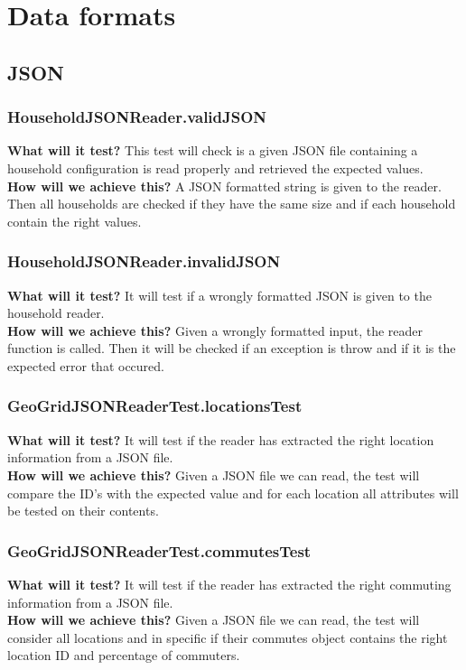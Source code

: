 \documentclass{article}
\begin{document}
\section{Data formats}
\subsection{JSON}
\subsubsection{HouseholdJSONReader.validJSON}
\textbf{What will it test?}
This test will check is a given JSON file containing a household configuration is read properly and retrieved the expected values. \\
\newline
\textbf{How will we achieve this?}
A JSON formatted string is given to the reader. Then all households are checked if they have the same size and if each household contain the right values.

\subsubsection{HouseholdJSONReader.invalidJSON}
\textbf{What will it test?}
It will test if a wrongly formatted JSON is given to the household reader.\\
\newline
\textbf{How will we achieve this?}
Given a wrongly formatted input, the reader function is called. Then it will be checked if an exception is throw and if it is the expected error that occured.

\subsubsection{GeoGridJSONReaderTest.locationsTest}
\textbf{What will it test?}
It will test if the reader has extracted the right location information from a JSON file. \\
\newline
\textbf{How will we achieve this?}
Given a JSON file we can read, the test will compare the ID's with the expected value and for each location all attributes will be tested on their contents.

\subsubsection{GeoGridJSONReaderTest.commutesTest}
\textbf{What will it test?}
It will test if the reader has extracted the right commuting information from a JSON file. \\
\newline
\textbf{How will we achieve this?}
Given a JSON file we can read, the test will consider all locations and in specific if their commutes object contains the right location ID and percentage of commuters.
\end{document}
